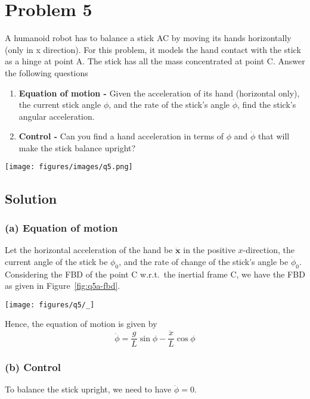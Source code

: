 \section*{Problem 5}

A humanoid robot has to balance a stick AC by moving its hands horizontally (only in x direction).
For this problem, it models the hand contact with the stick as a hinge at point A.
The stick has all the mass concentrated at point C.
Answer the following questions

\begin{enumerate}[label = (\alph*)]
    \item \textbf{Equation of motion -} Given the acceleration of its hand (horizontal only), the current stick angle \( \phi \), and the rate of the stick's angle \( \dot\phi \), find the stick's angular acceleration.
    \item \textbf{Control -} Can you find a hand acceleration in terms of \( \phi \) and \( \dot\phi \) that will make the stick balance upright?
\end{enumerate}

\begin{figure*}[h]
    \centering
    \texttt{[image: figures/images/q5.png]}
\end{figure*}

\subsection*{Solution}

\subsubsection*{(a) Equation of motion}

Let the horizontal acceleration of the hand be \( \mathbf{\ddot x} \) in the positive \(x\)-direction, the current angle of the stick be \( \phi_0 \), and the rate of change of the stick's angle be \( \dot\phi_0 \).
Considering the FBD of the point C w.r.t.\ the inertial frame C, we have the FBD as given in Figure~\ref{fig:q5a-fbd}.

\begin{figure*}[htb]
    \centering
    \texttt{[image: figures/q5/\_]}
    \caption{
        Free body diagram of the stick.
    }\label{fig:q5a-fbd}
\end{figure*}


Hence, the equation of motion is given by
\[
    \boxed{
        \ddot{\phi} = \frac{g}{L} \sin\phi - \frac{\ddot x}{L} \cos\phi
    }
\]

\subsubsection*{(b) Control}

To balance the stick upright, we need to have \( \ddot\phi = 0 \).
